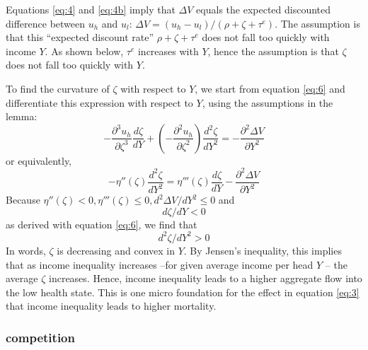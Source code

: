 \documentclass[a4paper,12pt]{article}
\begin{document}
Equations \eqref{eq:4} and \eqref{eq:4b} imply that \(\Delta V\) equals the expected discounted difference between \(u_h\) and \(u_l\): \(\Delta V = (u_h-u_l)/(\rho+\zeta+\tau^e)\). The assumption is that this ``expected discount rate'' \(\rho+\zeta+\tau^e\) does not fall too quickly with income \(Y\). As shown below, \(\tau^e\) increases with \(Y\), hence the assumption is that \(\zeta\) does not fall too quickly with \(Y\).

To find the curvature of \(\zeta\) with respect to \(Y\), we start from equation \eqref{eq:6} and differentiate this expression with respect to \(Y\), using the assumptions in the lemma:
\begin{equation}
\label{eq:33}
-\frac{\partial^3 u_h}{\partial \zeta^3} \frac{d\zeta}{dY} + \left(-\frac{\partial^2 u_h}{\partial \zeta^2} \right) \frac{d^2 \zeta}{dY^2} = - \frac{\partial^2 \Delta V}{\partial Y^2}
\end{equation}
or equivalently,
\begin{equation}
\label{eq:34}
- \eta''(\zeta) \frac{d^2 \zeta}{dY^2} = \eta'''(\zeta) \frac{d\zeta}{dY} - \frac{\partial^2 \Delta V}{\partial Y^2}
\end{equation}
Because \(\eta''(\zeta) <0, \eta'''(\zeta) \leq 0, d^2 \Delta V/dY^2 \leq 0\) and
\begin{equation}
\label{eq:40}
    d\zeta/dY < 0
\end{equation}
as derived with equation \eqref{eq:6}, we find that
\begin{equation}
\label{eq:30}
d^2 \zeta/dY^2 >0
\end{equation}
In words, \(\zeta\) is decreasing and convex in \(Y\). By Jensen's inequality, this implies that as income inequality increases --for given average income per head \(Y\) -- the average \(\zeta\) increases. Hence, income inequality leads to a higher aggregate flow into the low health state. This is one micro foundation for the effect in equation \eqref{eq:3} that income inequality leads to higher mortality.


\subsubsection{competition}
\label{sec:org3618c0b}
\end{document}
